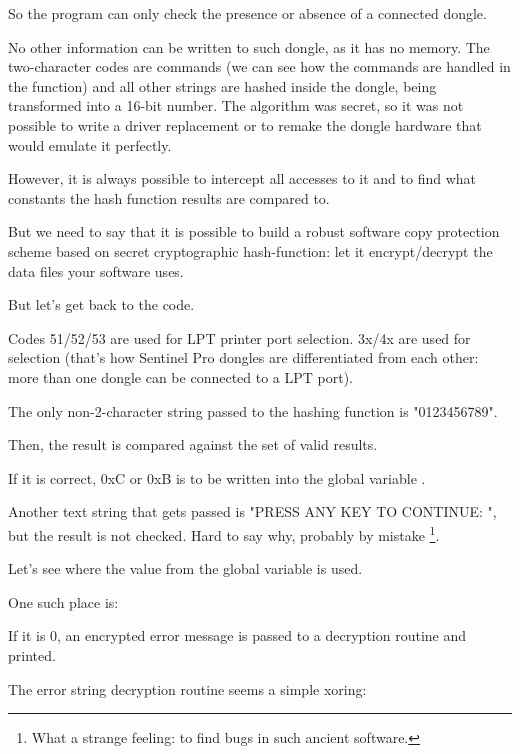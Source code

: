 So the program can only check the presence or absence of a connected dongle.

No other information can be written to such dongle, as it has no memory.
The two-character codes are commands
(we can see how the commands are handled in the 
 function) 
and all other strings are hashed inside the dongle, being transformed into a 16-bit number.
The algorithm was secret,
so it was not possible to write a driver replacement or to remake the dongle hardware that would emulate it perfectly.

However, it is always possible to intercept all accesses to it and to find what constants
the hash function results are compared to.

But we need to say that it is possible to build a robust software copy protection scheme based on secret
cryptographic hash-function: let it encrypt/decrypt the data files your software uses.

But let's get back to the code.

Codes 51/52/53 
are used for LPT printer port selection.
3x/4x are used for  
selection (that's how Sentinel Pro dongles are differentiated from each other: more than one
dongle can be connected to a LPT port).

The only non-2-character string passed to the hashing function is "0123456789".

Then, the result is compared against the set of valid results.

If it is correct, 0xC or 0xB is to be written into the global variable .%

Another text string that gets passed is
"PRESS ANY KEY TO CONTINUE: ", but the result is not checked.
Hard to say why, probably by mistake
\footnote{What a strange feeling: to find bugs in such ancient software.}.

Let's see where the value from the global variable  is used.

One such place is:



If it is 0, an encrypted error message is passed to a decryption routine and printed.


The error string decryption routine seems a simple \gls{xoring}:




